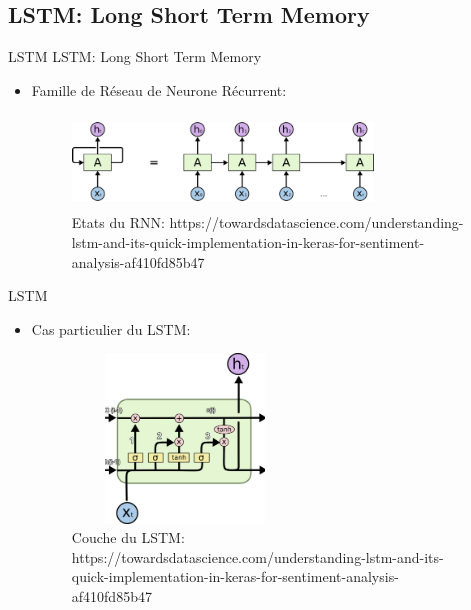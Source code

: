 \documentclass[xelatex,12pt]{beamer}
\begin{document}
\subsection{LSTM: Long Short Term Memory}
\begin{frame}{LSTM}
LSTM: Long Short Term Memory
\begin{itemize}
  	\item Famille de Réseau de Neurone Récurrent:
  		\begin{figure}[h]
\begin{center}
\includegraphics[width=8cm,height=2.5cm]{images/rnn_steps.png}
\caption[\scriptsize{Etats du RNN: https://towardsdatascience.com/understanding-lstm-and-its-quick-implementation-in-keras-for-sentiment-analysis-af410fd85b47}]{\scriptsize{Etats du RNN: https://towardsdatascience.com/understanding-lstm-and-its-quick-implementation-in-keras-for-sentiment-analysis-af410fd85b47}}
\label{monlabel}
\end{center}
\end{figure}
\end{itemize}
\end{frame}

\begin{frame}{LSTM}
\begin{itemize}
	\item Cas particulier du LSTM:\\
		  		\begin{figure}[h]
\begin{center}
\includegraphics[width=6cm,height=4.5cm]{images/lstm_layer.png}
\caption[\scriptsize{Couche du LSTM: https://towardsdatascience.com/understanding-lstm-and-its-quick-implementation-in-keras-for-sentiment-analysis-af410fd85b47}]{\scriptsize{Couche du LSTM: https://towardsdatascience.com/understanding-lstm-and-its-quick-implementation-in-keras-for-sentiment-analysis-af410fd85b47}}
\label{monlabel}
\end{center}
\end{figure}

\end{itemize}
\end{frame}
\end{document}
